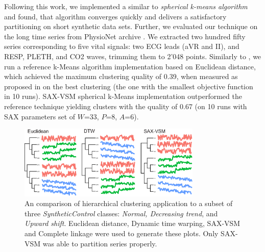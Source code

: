 \documentclass[conference]{IEEEtran}
\newcommand{\myfigureshrinker}{\vspace{0.05cm}}
\begin{document}
Following this work, we implemented a similar to \cite{modha} \textit{spherical k-means algorithm}
and found, that algorithm converges quickly and delivers a satisfactory partitioning on short
synthetic data sets. Further, we evaluated our technique on the long time series from PhysioNet 
archive \cite{physionet}. 
We extracted two hundred fifty series corresponding to five vital signals: two ECG leads 
(aVR and II), and RESP, PLETH, and CO2 waves, trimming them to 2'048 points. Similarly to
\cite{bag_patterns}, we run a reference k-Means algorithm implementation based on Euclidean
distance, which achieved the maximum clustering quality of 0.39, when measured as proposed in
\cite{kmetrics} on the best clustering (the one with the smallest objective function in 10 runs). 
SAX-VSM spherical k-Means implementation outperformed the reference technique yielding 
clusters  with the quality of 0.67 (on 10 runs with SAX parameters set of 
$W$=33, $P$=8, $A$=6).


\begin{figure}[t]
   \myfigureshrinker
   \centering
   \includegraphics[width=87mm]{figures/clustering.eps}
   \caption{An comparison of hierarchical clustering application to a subset of three
   \textit{SyntheticControl} classes: \textit{Normal, Decreasing trend}, and \textit{Upward shift}. 
   Euclidean distance, Dynamic time warping, SAX-VSM and Complete linkage were used to 
   generate these plots. Only SAX-VSM was able to partition series properly.                       
   }
   \label{fig:hc}
\end{figure}
\end{document}
